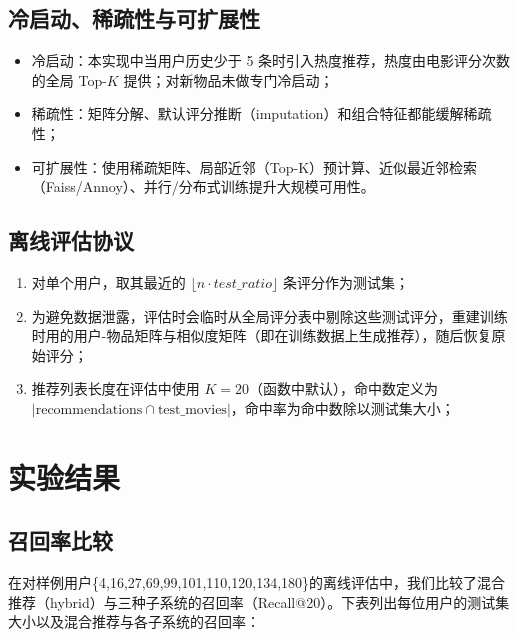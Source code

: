 \subsection{冷启动、稀疏性与可扩展性}
\begin{itemize}
  \item 冷启动：本实现中当用户历史少于 5 条时引入热度推荐，热度由电影评分次数的全局 Top-$K$ 提供；对新物品未做专门冷启动；
  \item 稀疏性：矩阵分解、默认评分推断（imputation）和组合特征都能缓解稀疏性；
  \item 可扩展性：使用稀疏矩阵、局部近邻（Top-K）预计算、近似最近邻检索（Faiss/Annoy）、并行/分布式训练提升大规模可用性。
\end{itemize}

\subsection{离线评估协议}

\begin{enumerate}
  \item 对单个用户，取其最近的 $\lfloor n\cdot test\_ratio\rfloor$ 条评分作为测试集；
  \item 为避免数据泄露，评估时会临时从全局评分表中剔除这些测试评分，重建训练时用的用户-物品矩阵与相似度矩阵（即在训练数据上生成推荐），随后恢复原始评分；
  \item 推荐列表长度在评估中使用 $K=20$（函数中默认），命中数定义为 $|\text{recommendations}\cap\text{test\_movies}|$，命中率为命中数除以测试集大小；
\end{enumerate}

\section{实验结果}

\subsection{召回率比较}

在对样例用户\{4,16,27,69,99,101,110,120,134,180\}的离线评估中，我们比较了混合推荐（hybrid）与三种子系统的召回率（Recall@20）。下表列出每位用户的测试集大小以及混合推荐与各子系统的召回率：

